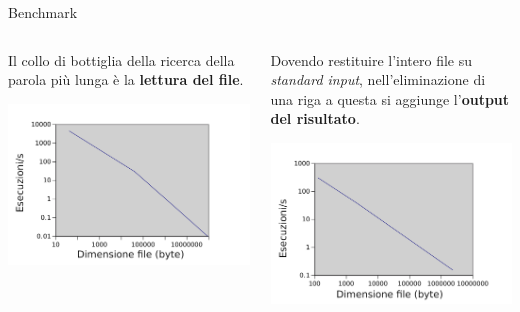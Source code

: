 \documentclass[8pt]{beamer}
\begin{document}
\begin{frame}{Benchmark}
  \begin{columns}
    \begin{column}{0.45\textwidth}
  Il collo di bottiglia della ricerca della parola più lunga è la \textbf{lettura del file}.
  \begin{center}
    \includegraphics[width=\textwidth]{WLBench}
  \end{center}
\end{column}
\begin{column}{0.45\textwidth}
  Dovendo restituire l'intero file su \textit{standard input}, nell'eliminazione di una riga a questa si aggiunge l'\textbf{output del risultato}.
  \begin{center}
    \includegraphics[width=\textwidth]{DLBench}
  \end{center}
\end{column}
\end{columns}
\end{frame}
\end{document}
